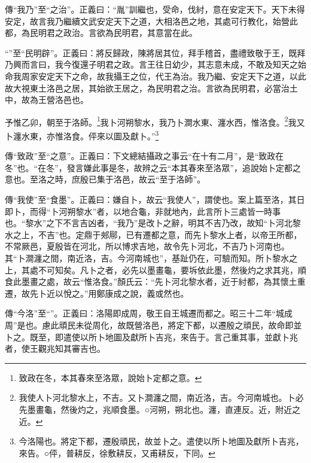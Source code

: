 {\noindent\zhuan{}\fzbyks 傳“我乃”至“之治”。正義曰：“胤”訓繼也，受命，伐紂，意在安定天下。天下未得安定，故言我乃繼續文武安定天下之道，大相洛邑之地，其處可行教化，始營此都，為民明君之政治。言欲為民明君，其意當在此。 \par}

{\noindent\shu{}\fzkt “”至“民明辟”。正義曰：將反歸政，陳將居其位，拜手稽首，盡禮致敬于王，既拜乃興而言曰，我今復還子明君之政。言王往日幼少，其志意未成，不敢及知天之始命我周家安定天下之命，故我攝王之位，代王為治。我乃繼、安定天下之道，以此故大視東土洛邑之居，其始欲王居之，為民明君之治。言欲為民明君，必當治土中，故為王營洛邑也。 \par}

予惟乙卯，朝至于洛師。\footnote{致政在冬，本其春來至洛眾，說始卜定都之意。}我卜河朔黎水，我乃卜澗水東、瀍水西，惟洛食。\footnote{我使人卜河北黎水上，不吉。又卜澗瀍之間，南近洛，吉。今河南城也。卜必先墨畫龜，然後灼之，兆順食墨。○河朔，朔北也。瀍，直連反。近，附近之近。}我又卜瀍水東，亦惟洛食。伻來以圖及獻卜。”\footnote{今洛陽也。將定下都，遷殷頑民，故並卜之。遣使以所卜地圖及獻所卜吉兆，來告。○伻，普耕反，徐敷耕反，又甫耕反，下同。}


{\noindent\zhuan{}\fzbyks 傳“致政”至“之意”。正義曰：下文總結攝政之事云“在十有二月”，是“致政在冬”也。“在冬”，發言嫌此事是冬，故辨之云“本其春來至洛眾”，追說始卜定都之意也。至洛之時，庶殷已集于洛邑，故云“至于洛師”。 \par}

{\noindent\zhuan{}\fzbyks 傳“我使”至“食墨”。正義曰：嫌自卜，故云“我使人”，謂使也。案上篇至洛，其日即卜，而得“卜河朔黎水”者，以地合龜，非就地內，此言所卜三處皆一時事也。“黎水”之下不言吉凶者，“我乃”是改卜之辭，明其不吉乃改，故知“卜河北黎水之上，不吉”也。定鼎于郟鄏，已有遷都之意，而先卜黎水上者，以帝王所都，不常厥邑，夏殷皆在河北，所以博求吉地，故令先卜河北，不吉乃卜河南也。其“卜澗瀍之間，南近洛，吉。今河南城也”，基趾仍在，可驗而知。所卜黎水之上，其處不可知矣。凡卜之者，必先以墨畫龜，要坼依此墨，然後灼之求其兆，順食此墨畫之處，故云“惟洛食。”顏氏云：“先卜河北黎水者，近于紂都，為其懷土重遷，故先卜近以悅之。”用鄭康成之說，義或然也。 \par}

{\noindent\zhuan{}\fzbyks 傳“今洛”至“”。正義曰：洛陽即成周，敬王自王城遷而都之。昭三十二年“城成周”是也。慮此頑民未從周化，故既營洛邑，將定下都，以遷殷之頑民，故命即並卜之。既至，即遣使以所卜地圖及獻所卜吉兆，來告于。言己重其事，並獻卜兆者，使王觀兆知其審吉也。 \par}

